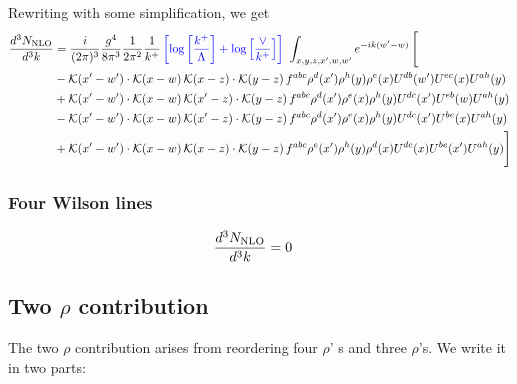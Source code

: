 \documentclass[aps,prd,amsmath,amssymb,nofootinbib]{revtex4-2}
\numberwithin{equation}{section}
\begin{document}
Rewriting with some simplification, we get
\begin{align}
      \frac{d^{3}N_{\rm NLO}}{d^{3}k} & = \frac{i}{(2\pi)^{3}}\frac{g^{4}}{8\pi^{3}}\frac{1}{2\pi^{2}} \frac{1}{k^{+}}\,{\color{blue}\left[\log{\left[\frac{k^{+}}{\Lambda}\right]}+\log{\left[\frac{\vee}{k^{+}}\right]}\right]}\,\,\int_{x,y,z,x^{\prime},w,w^{\prime}}e^{-ik(w^{\prime}-w)}\, \Bigg[\notag \\ & - \mathcal{K}(x'-w')\cdot \mathcal{K}(x-w)\, \mathcal{K}(x-z)\cdot \mathcal{K}(y-z)\, f^{a b c} \rho^{d}(x') \rho^{h}(y) \rho^{e}(x) U^{d b}(w') U^{e c}(x) U^{a h}(y)\nonumber\\
    &+ \mathcal{K}(x'-w')\cdot \mathcal{K}(x-w)\,\mathcal{K}(x'-z)\cdot \mathcal{K}(y-z)\, f^{a b c} \rho^{d}(x') \rho^{e}(x) \rho^{h}(y) U^{d c}(x') U^{e b}(w) U^{a h}(y)\nonumber\\
    &- \mathcal{K}(x'-w')\cdot \mathcal{K}(x-w)\,\mathcal{K}(x'-z)\cdot \mathcal{K}(y-z)\, f^{a b c} \rho^{d}(x') \rho^{e}(x) \rho^{h}(y) U^{d c}(x') U^{b e}(x) U^{a h}(y)\nonumber\\
    &+  \mathcal{K}(x'-w')\cdot \mathcal{K}(x-w)\, \mathcal{K}(x-z)\cdot \mathcal{K}(y-z)\, f^{a b c} \rho^{e}(x') \rho^{h}(y) \rho^{d}(x) U^{d c}(x) U^{b e}(x') U^{a h}(y) \Bigg]
\end{align}
\subsubsection{Four Wilson lines}
\begin{align}
    \frac{d^{3}N_{\rm NLO}}{d^{3}k} & = 0 
\end{align}    
\subsection{Two $\rho$ contribution}
The two $\rho$ contribution arises from reordering four $\rho$' s and three $\rho$'s. We write it in two parts:
\end{document}
